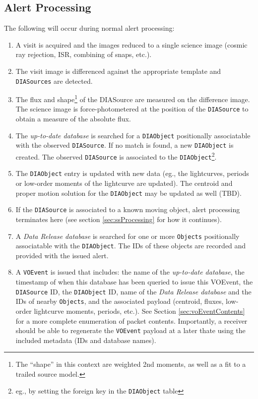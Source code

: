 \documentclass[12pt]{article}
\newcommand{\code}[1]{\texttt{#1}}
\newcommand{\DIASource}{\code{DIASource}\xspace}
\newcommand{\DIASources}{\code{DIASources}\xspace}
\newcommand{\DIAObject}{\code{DIAObject}\xspace}
\newcommand{\DB}{{\em up-to-date database}\xspace}
\newcommand{\DR}{{\em Data Release database}\xspace}
\newcommand{\Objects}{\code{Objects}\xspace}
\newcommand{\VOEvent}{\code{VOEvent}\xspace}
\begin{document}
\subsection{Alert Processing}

The following will occur during normal alert processing:
\begin{enumerate}
\item A visit is acquired and the images reduced to a single science image (cosmic ray rejection, ISR, combining of snaps, etc.).
\item The visit image is differenced against the appropriate template and \DIASources are detected.
\item The flux and shape\footnote{The ``shape'' in this context are weighted 2nd moments, as well as a fit to a trailed source model.} of the DIASource are measured on the difference image. The science image is force-photometered at the position of the \DIASource to obtain a measure of the absolute flux.
\item The \DB is searched for a \DIAObject positionally associatable with the observed \DIASource. If no match is found, a new \DIAObject is created. The observed \DIASource is associated to the \DIAObject\footnote{eg., by setting the foreign key in the \DIAObject table}.
\item The \DIAObject entry is updated with new data (eg., the lightcurves, periods or low-order moments of the lightcurve are updated). The centroid and proper motion solution for the \DIAObject may be updated as well (TBD).
\item If the \DIASource is associated to a known moving object, alert processing terminates here (see section \ref{sec:ssProcessing} for how it continues).
\item A \DR is searched for one or more \Objects positionally associatable with the \DIAObject. The IDs of these objects are recorded and provided with the issued alert.
\item A \VOEvent is issued that includes: the name of the \DB, the timestamp of when this database has been queried to issue this VOEvent, the \DIASource ID, the \DIAObject ID, name of the \DR and the IDs of nearby \Objects, and the associated payload (centroid, fluxes, low-order lightcurve moments, periods, etc.). See Section \ref{sec:voEventContents} for a more complete enumeration of packet contents. Importantly, a receiver should be able to regenerate the \VOEvent payload at a later thate using the included metadata (IDs and database names).
\end{enumerate}
\end{document}
